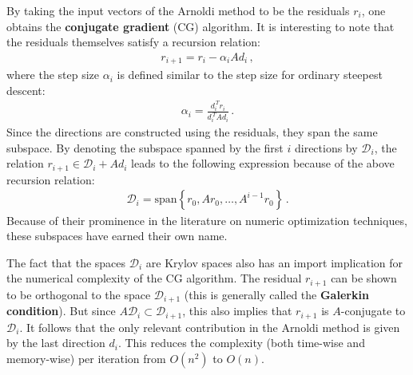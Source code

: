     By taking the input vectors of the Arnoldi method to be the residuals $r_i$, one obtains the \textbf{conjugate gradient} (CG) algorithm. It is interesting to note that the residuals themselves satisfy a recursion relation:
    \begin{gather}
        r_{i+1} = r_i - \alpha_iAd_i\,,
    \end{gather}
    where the step size $\alpha_i$ is defined similar to the step size for ordinary steepest descent:
    \begin{gather}
        \alpha_i = \frac{d_i^{\,T}r_i}{d_i^{\,T}\!Ad_i}\,.
    \end{gather}
    Since the directions are constructed using the residuals, they span the same subspace. By denoting the subspace spanned by the first $i$ directions by $\mathcal{D}_i$, the relation $r_{i+1}\in\mathcal{D}_i+Ad_i$ leads to the following expression because of the above recursion relation:
    \begin{gather}
        \mathcal{D}_i = \mathrm{span}\left\{r_0,Ar_0,\ldots,A^{i-1}r_0\right\}\,.
    \end{gather}
    Because of their prominence in the literature on numeric optimization techniques, these subspaces have earned their own name.

    The fact that the spaces $\mathcal{D}_i$ are Krylov spaces also has an import implication for the numerical complexity of the CG algorithm. The residual $r_{i+1}$ can be shown to be orthogonal to the space $\mathcal{D}_{i+1}$ (this is generally called the \textbf{Galerkin condition}). But since $A\mathcal{D}_i\subset\mathcal{D}_{i+1}$, this also implies that $r_{i+1}$ is $A$-conjugate to $\mathcal{D}_i$. It follows that the only relevant contribution in the Arnoldi method is given by the last direction $d_i$. This reduces the complexity (both time-wise and memory-wise) per iteration from $O(n^2)$ to $O(n)$.

